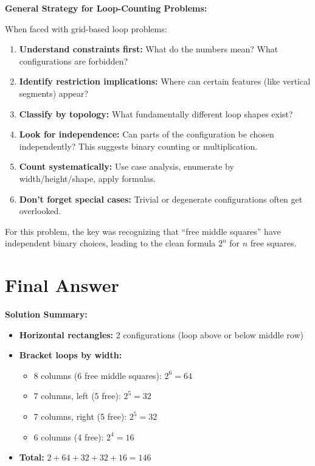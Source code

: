 \documentclass[12pt]{article}
\begin{document}
\begin{protip}
\textbf{General Strategy for Loop-Counting Problems:}

When faced with grid-based loop problems:
\begin{enumerate}
    \item \textbf{Understand constraints first:} What do the numbers mean? What configurations are forbidden?
    
    \item \textbf{Identify restriction implications:} Where can certain features (like vertical segments) appear?
    
    \item \textbf{Classify by topology:} What fundamentally different loop shapes exist?
    
    \item \textbf{Look for independence:} Can parts of the configuration be chosen independently? This suggests binary counting or multiplication.
    
    \item \textbf{Count systematically:} Use case analysis, enumerate by width/height/shape, apply formulas.
    
    \item \textbf{Don't forget special cases:} Trivial or degenerate configurations often get overlooked.
\end{enumerate}

For this problem, the key was recognizing that ``free middle squares'' have independent binary choices, leading to the clean formula $2^n$ for $n$ free squares.
\end{protip}

\section{Final Answer}

\begin{center}
\Large
{}
\end{center}

\textbf{Solution Summary:}
\begin{itemize}
    \item \textbf{Horizontal rectangles:} 2 configurations (loop above or below middle row)
    \item \textbf{Bracket loops by width:}
    \begin{itemize}
        \item 8 columns (6 free middle squares): $2^6 = 64$
        \item 7 columns, left (5 free): $2^5 = 32$
        \item 7 columns, right (5 free): $2^5 = 32$
        \item 6 columns (4 free): $2^4 = 16$
    \end{itemize}
    \item \textbf{Total:} $2 + 64 + 32 + 32 + 16 = 146$
\end{itemize}
\end{document}
